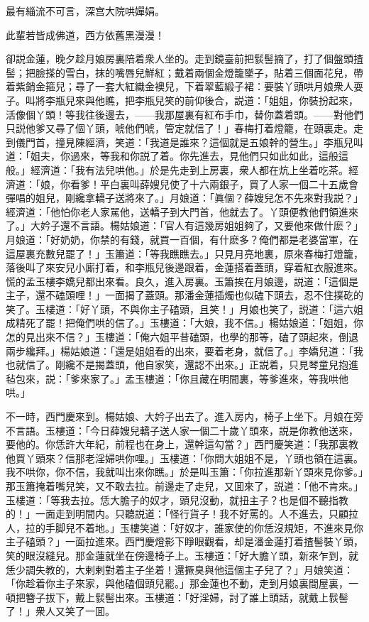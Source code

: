 最有緇流不可言，深宫大院哄嬋娟。

此輩若皆成佛道，西方依舊黑漫漫！

卻説金蓮，晚夕趁月娘房裏陪着衆人坐的。走到鏡臺前把䯼髻摘了，打了個盤頭揸髻；把臉搽的雪白，抹的嘴唇兒鮮紅；戴着兩個金燈籠墜子，貼着三個面花兒，帶着紫銷金箍兒；尋了一套大紅織金襖兒，下着翠藍緞子裙：要裝丫頭哄月娘衆人耍子。叫將李瓶兒來與他瞧，把李瓶兒笑的前仰後合，説道：「姐姐，你裝扮起來，活像個丫頭！等我往後邊去，——我那屋裏有紅布手巾，替你蓋着頭。——對他們只説他爹又尋了個丫頭，唬他們唬，管定就信了！」春梅打着燈籠，在頭裏走。走到儀門首，撞見陳經濟，笑道：「我道是誰來？這個就是五娘幹的營生。」李瓶兒叫道：「姐夫，你過來，等我和你説了着。你先進去，見他們只如此如此，這般這般。」經濟道：「我有法兒哄他。」於是先走到上房裏，衆人都在炕上坐着吃茶。經濟道：「娘，你看爹！平白裏叫薛嫂兒使了十六兩銀子，買了人家一個二十五歲會彈唱的姐兒，剛纔拿轎子送將來了。」月娘道：「眞個？薛嫂兒怎不先來對我説？」經濟道：「他怕你老人家駡他，送轎子到大門首，他就去了。丫頭便教他們領進來了。」大妗子還不言語。楊姑娘道：「官人有這幾房姐姐夠了，又要他來做什麽？」月娘道：「好奶奶，你禁的有錢，就買一百個，有什麽多？俺們都是老婆當軍，在這屋裏充數兒罷了！」玉簫道：「等我瞧瞧去。」只見月亮地裏，原來春梅打燈籠，落後叫了來安兒小廝打着，和李瓶兒後邊跟着，金蓮搭着蓋頭，穿着紅衣服進來。慌的孟玉樓李嬌兒都出來看。良久，進入房裏。玉簫挨在月娘邊，説道：「這個是主子，還不磕頭哩！」一面揭了蓋頭。那潘金蓮插燭也似磕下頭去，忍不住撲矻的笑了。玉樓道：「好丫頭，不與你主子磕頭，且笑！」月娘也笑了，説道：「這六姐成精死了罷！把俺們哄的信了。」玉樓道：「大娘，我不信。」楊姑娘道：「姐姐，你怎的見出來不信？」玉樓道：「俺六姐平昔磕頭，也學的那等，磕了頭起來，倒退兩步纔拜。」楊姑娘道：「還是姐姐看的出來，要着老身，就信了。」李嬌兒道：「我也就信了。剛纔不是揭蓋頭，他自家笑，還認不出來。」正説着，只見琴童兒抱進毡包來，説：「爹來家了。」孟玉樓道：「你且藏在明間裏，等爹進來，等我哄他哄。」

不一時，西門慶來到。楊姑娘、大妗子出去了。進入房内，椅子上坐下。月娘在旁不言語。玉樓道：「今日薛嫂兒轎子送人家一個二十歲丫頭來，説是你教他送來，要他的。你恁許大年紀，前程也在身上，還幹這勾當？」西門慶笑道：「我那裏教他買丫頭來？信那老淫婦哄你哩。」玉樓道：「你問大姐姐不是，丫頭也領在這裏。我不哄你，你不信，我就叫出來你瞧。」於是叫玉簫：「你拉進那新丫頭來見你爹。」那玉簫掩着嘴兒笑，又不敢去拉。前邊走了走兒，又囬來了，説道：「他不肯來。」玉樓道：「等我去拉。恁大膽子的奴才，頭兒沒動，就扭主子？也是個不聽指教的！」一面走到明間内。只聽説道：「怪行貨子！我不好罵的。人不進去，只顧拉人，拉的手脚兒不着地。」玉樓笑道：「好奴才，誰家使的你恁沒規矩，不進來見你主子磕頭？」一面拉進來。西門慶燈影下睜眼觀看，却是潘金蓮打着揸髻裝丫頭，笑的眼沒縫兒。那金蓮就坐在傍邊椅子上。玉樓道：「好大膽丫頭，新來乍到，就恁少調失教的，大剌剌對着主子坐着！還撅臭與他這個主子兒了？」月娘笑道：「你趁着你主子來家，與他磕個頭兒罷。」那金蓮也不動，走到月娘裏間屋裏，一頓把簪子拔下，戴上䯼髻出來。玉樓道：「好淫婦，討了誰上頭話，就戴上䯼髻了！」衆人又笑了一囬。

